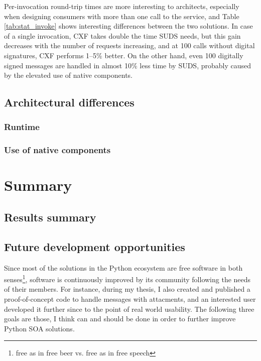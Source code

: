 \noindent
Per-invocation round-trip times are more interesting to architects, especially when designing consumers with more than one call to the service, and Table \ref{tab:stat_invoke} shows interesting differences between the two solutions. In case of a single invocation, CXF takes double the time SUDS needs, but this gain decreases with the number of requests increasing, and at 100 calls without digital signatures, CXF performs 1--5\% better. On the other hand, even 100 digitally signed messages are handled in almost 10\% less time by SUDS, probably caused by the elevated use of native components.

\section{Architectural differences}

\subsection{Runtime}


\subsection{Use of native components}


\chapter{Summary}

\section{Results summary}

\section{Future development opportunities}

Since most of the solutions in the Python ecosystem are free software in both senses\footnote{free as in free beer vs. free as in free speech}, software is continuously improved by its community following the needs of their members. For instance, during my thesis, I also created and published a proof-of-concept code to handle messages with attacments, and an interested user developed it further since to the point of real world usability. The following three goals are those, I think can and should be done in order to further improve Python SOA solutions.

